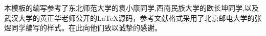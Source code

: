 \begin{thanks}
本模板的编写参考了东北师范大学的袁小康同学,西南民族大学的欧长坤同学,以及武汉大学的黄正华老师公开的\LaTeX 源码，参考文献格式采用了北京邮电大学的张煜同学编写的样式。在此向他们致以诚挚的感谢。
\end{thanks}